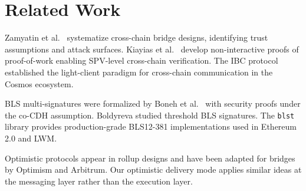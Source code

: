 \section{Related Work}
\label{sec:related}

Zamyatin et al.\ \cite{zamyatin2021bridge} systematize cross-chain bridge designs, identifying trust assumptions and attack surfaces. Kiayias et al.\ \cite{kiayias2016proofs} develop non-interactive proofs of proof-of-work enabling SPV-level cross-chain verification. The IBC protocol \cite{goes2020ibc} established the light-client paradigm for cross-chain communication in the Cosmos ecosystem.

BLS multi-signatures were formalized by Boneh et al.\ \cite{boneh2018compact} with security proofs under the co-CDH assumption. Boldyreva \cite{boldyreva2003threshold} studied threshold BLS signatures. The \texttt{blst} library \cite{bowe2017bls12381} provides production-grade BLS12-381 implementations used in Ethereum 2.0 and LWM.

Optimistic protocols appear in rollup designs \cite{kalodner2018arbitrum, buterin2020rollup} and have been adapted for bridges by Optimism and Arbitrum. Our optimistic delivery mode applies similar ideas at the messaging layer rather than the execution layer.

